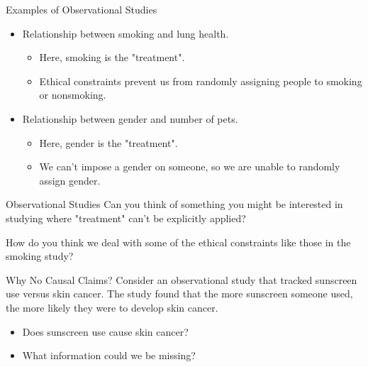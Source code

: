 \begin{frame}{Examples of Observational Studies}
    \begin{itemize}
        \item Relationship between smoking and lung health.
        \begin{itemize}
            \item Here, smoking is the "treatment".
            \item Ethical constraints prevent us from randomly assigning people to smoking or nonsmoking.
        \end{itemize}
        \item Relationship between gender and number of pets.
        \begin{itemize}
            \item Here, gender is the "treatment".
            \item We can't impose a gender on someone, so we are unable to randomly assign gender.
        \end{itemize}
    \end{itemize}
\end{frame}

\begin{frame}{Observational Studies}
    Can you think of something you might be interested in studying where "treatment" can't be explicitly applied? 
    
    \vspace{18pt}
    How do you think we deal with some of the ethical constraints like those in the smoking study? 
\end{frame}

\begin{frame}{Why No Causal Claims?}
    Consider an observational study that tracked sunscreen use versus skin cancer. The study found that the more sunscreen someone used, the more likely they were to develop skin cancer. 
    
    \begin{itemize}
        \item Does sunscreen use cause skin cancer?
        \item What information could we be missing?
    \end{itemize}
\end{frame}

